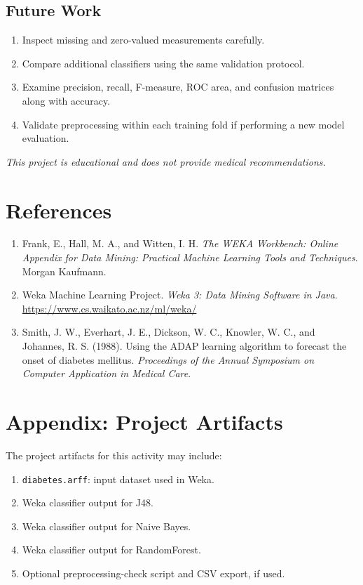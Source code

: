 \documentclass[11pt,a4paper]{article}
\begin{document}
\subsection{Future Work}
\begin{enumerate}
    \item Inspect missing and zero-valued measurements carefully.
    \item Compare additional classifiers using the same validation protocol.
    \item Examine precision, recall, F-measure, ROC area, and confusion matrices along with accuracy.
    \item Validate preprocessing within each training fold if performing a new model evaluation.
\end{enumerate}
\textit{This project is educational and does not provide medical recommendations.}

\section{References}
\begin{enumerate}
    \item Frank, E., Hall, M. A., and Witten, I. H. \textit{The WEKA Workbench: Online Appendix for Data Mining: Practical Machine Learning Tools and Techniques}. Morgan Kaufmann.
    \item Weka Machine Learning Project. \textit{Weka 3: Data Mining Software in Java}. \url{https://www.cs.waikato.ac.nz/ml/weka/}
    \item Smith, J. W., Everhart, J. E., Dickson, W. C., Knowler, W. C., and Johannes, R. S. (1988). Using the ADAP learning algorithm to forecast the onset of diabetes mellitus. \textit{Proceedings of the Annual Symposium on Computer Application in Medical Care}.
\end{enumerate}

\section*{Appendix: Project Artifacts}
The project artifacts for this activity may include:
\begin{enumerate}
    \item \texttt{diabetes.arff}: input dataset used in Weka.
    \item Weka classifier output for J48.
    \item Weka classifier output for Naive Bayes.
    \item Weka classifier output for RandomForest.
    \item Optional preprocessing-check script and CSV export, if used.
\end{enumerate}
\end{document}
